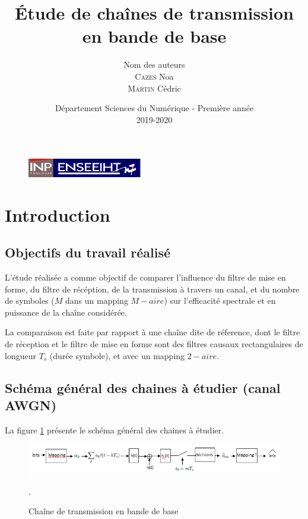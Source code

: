 \documentclass[frenchb]{article}
\begin{document}
\begin{figure}[t]
\centering
\includegraphics[width=5cm]{inp_n7.png}
\end{figure}

\title{\vspace{4cm} \textbf{Étude de chaînes de transmission en bande de base}}
\author{Nom des auteurs\\ \textsc{Cazes} Noa\\ \textsc{Martin} Cédric}
\date{\vspace{11cm} Département Sciences du Numérique - Première année \\
2019-2020 }

\maketitle

\newpage
\tableofcontents
\listoffigures

\newpage
\section{Introduction}
\subsection{Objectifs du travail réalisé}
L'étude réalisée a comme objectif de comparer l'influence du filtre de mise en forme, du filtre de récéption, de la transmission à travers un canal, et du nombre de symboles ($M$ dans un mapping $M-aire$) sur l'efficacité spectrale et en puissance de la chaîne considérée.

La comparaison est faite par rapport à une chaîne dite de réference, dont le filtre de réception et le filtre de mise en forme sont des filtres causaux rectangulaires de longueur $T_s$ (durée symbole), et avec un mapping $2-aire$.

\subsection{Schéma général des chaines à étudier (canal AWGN)}
La figure \ref{chaine_ex1} présente le schéma général des chaines à étudier.

\begin{figure}[ht!]
\centering
\includegraphics[width=15cm]{figure1.png}
\caption{Chaîne de transmission en bande de base}.
\label{chaine_ex1}
\end{figure}
\end{document}
